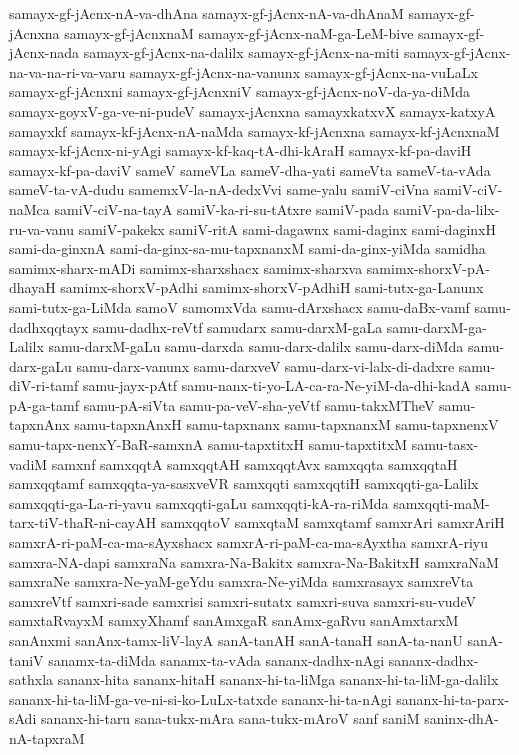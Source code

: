 {samayx-gf-jAcnx-nA-va-dhAna
samayx-gf-jAcnx-nA-va-dhAnaM
samayx-gf-jAcnxna
samayx-gf-jAcnxnaM
samayx-gf-jAcnx-naM-ga-LeM-bive
samayx-gf-jAcnx-nada
samayx-gf-jAcnx-na-dalilx
samayx-gf-jAcnx-na-miti
samayx-gf-jAcnx-na-va-na-ri-va-varu
samayx-gf-jAcnx-na-vanunx
samayx-gf-jAcnx-na-vuLaLx
samayx-gf-jAcnxni
samayx-gf-jAcnxniV
samayx-gf-jAcnx-noV-da-ya-diMda
samayx-goyxV-ga-ve-ni-pudeV
samayx-jAcnxna
samayxkatxvX
samayx-katxyA
samayxkf
samayx-kf-jAcnx-nA-naMda
samayx-kf-jAcnxna
samayx-kf-jAcnxnaM
samayx-kf-jAcnx-ni-yAgi
samayx-kf-kaq-tA-dhi-kAraH
samayx-kf-pa-daviH
samayx-kf-pa-daviV
sameV
sameVLa
sameV-dha-yati
sameVta
sameV-ta-vAda
sameV-ta-vA-dudu
samemxV-la-nA-dedxVvi
same-yalu
samiV-ciVna
samiV-ciV-naMca
samiV-ciV-na-tayA
samiV-ka-ri-su-tAtxre
samiV-pada
samiV-pa-da-lilx-ru-va-vanu
samiV-pakekx
samiV-ritA
sami-dagawnx
sami-daginx
sami-daginxH
sami-da-ginxnA
sami-da-ginx-sa-mu-tapxnanxM
sami-da-ginx-yiMda
samidha
samimx-sharx-mADi
samimx-sharxshacx
samimx-sharxva
samimx-shorxV-pA-dhayaH
samimx-shorxV-pAdhi
samimx-shorxV-pAdhiH
sami-tutx-ga-Lanunx
sami-tutx-ga-LiMda
samoV
samomxVda
samu-dArxshacx
samu-daBx-vamf
samu-dadhxqqtayx
samu-dadhx-reVtf
samudarx
samu-darxM-gaLa
samu-darxM-ga-Lalilx
samu-darxM-gaLu
samu-darxda
samu-darx-dalilx
samu-darx-diMda
samu-darx-gaLu
samu-darx-vanunx
samu-darxveV
samu-darx-vi-lalx-di-dadxre
samu-diV-ri-tamf
samu-jayx-pAtf
samu-nanx-ti-yo-LA-ca-ra-Ne-yiM-da-dhi-kadA
samu-pA-ga-tamf
samu-pA-siVta
samu-pa-veV-sha-yeVtf
samu-takxMTheV
samu-tapxnAnx
samu-tapxnAnxH
samu-tapxnanx
samu-tapxnanxM
samu-tapxnenxV
samu-tapx-nenxY-BaR-samxnA
samu-tapxtitxH
samu-tapxtitxM
samu-tasx-vadiM
samxnf
samxqqtA
samxqqtAH
samxqqtAvx
samxqqta
samxqqtaH
samxqqtamf
samxqqta-ya-sasxveVR
samxqqti
samxqqtiH
samxqqti-ga-Lalilx
samxqqti-ga-La-ri-yavu
samxqqti-gaLu
samxqqti-kA-ra-riMda
samxqqti-maM-tarx-tiV-thaR-ni-cayAH
samxqqtoV
samxqtaM
samxqtamf
samxrAri
samxrAriH
samxrA-ri-paM-ca-ma-sAyxshacx
samxrA-ri-paM-ca-ma-sAyxtha
samxrA-riyu
samxra-NA-dapi
samxraNa
samxra-Na-Bakitx
samxra-Na-BakitxH
samxraNaM
samxraNe
samxra-Ne-yaM-geYdu
samxra-Ne-yiMda
samxrasayx
samxreVta
samxreVtf
samxri-sade
samxrisi
samxri-sutatx
samxri-suva
samxri-su-vudeV
samxtaRvayxM
samxyXhamf
sanAmxgaR
sanAmx-gaRvu
sanAmxtarxM
sanAnxmi
sanAnx-tamx-liV-layA
sanA-tanAH
sanA-tanaH
sanA-ta-nanU
sanA-taniV
sanamx-ta-diMda
sanamx-ta-vAda
sananx-dadhx-nAgi
sananx-dadhx-sathxla
sananx-hita
sananx-hitaH
sananx-hi-ta-liMga
sananx-hi-ta-liM-ga-dalilx
sananx-hi-ta-liM-ga-ve-ni-si-ko-LuLx-tatxde
sananx-hi-ta-nAgi
sananx-hi-ta-parx-sAdi
sananx-hi-taru
sana-tukx-mAra
sana-tukx-mAroV
sanf
saniM
saninx-dhA-nA-tapxraM
}
